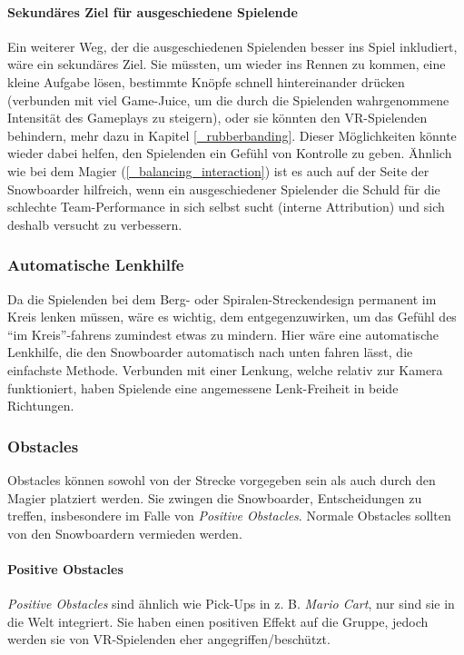 \paragraph{Sekundäres Ziel für ausgeschiedene Spielende}
Ein weiterer Weg, der die ausgeschiedenen Spielenden besser ins Spiel inkludiert, wäre ein sekundäres Ziel. Sie müssten, um wieder ins Rennen zu kommen, eine kleine Aufgabe lösen, bestimmte Knöpfe schnell hintereinander drücken (verbunden mit viel Game-Juice, um die durch die Spielenden wahrgenommene Intensität des Gameplays zu steigern), oder sie könnten den VR-Spielenden behindern, mehr dazu in Kapitel \ref{_rubberbanding}. Dieser Möglichkeiten könnte wieder dabei helfen, den Spielenden ein Gefühl von Kontrolle zu geben. Ähnlich wie bei dem Magier (\ref{_balancing_interaction}) ist es auch auf der Seite der Snowboarder hilfreich, wenn ein ausgeschiedener Spielender die Schuld für die schlechte Team-Performance in sich selbst sucht (interne Attribution) und sich deshalb versucht zu verbessern.

\subsubsection{Automatische Lenkhilfe}
Da die Spielenden bei dem Berg- oder Spiralen-Streckendesign permanent im Kreis lenken müssen, wäre es wichtig, dem entgegenzuwirken, um das Gefühl des "`im Kreis"'-fahrens zumindest etwas zu mindern. Hier wäre eine automatische Lenkhilfe, die den Snowboarder automatisch nach unten fahren lässt, die einfachste Methode. Verbunden mit einer Lenkung, welche relativ zur Kamera funktioniert, haben Spielende eine angemessene Lenk-Freiheit in beide Richtungen.

\subsubsection{Obstacles}
Obstacles können sowohl von der Strecke vorgegeben sein als auch durch den Magier platziert werden. Sie zwingen die Snowboarder, Entscheidungen zu treffen, insbesondere im Falle von \emph{Positive Obstacles}. Normale Obstacles sollten von den Snowboardern vermieden werden.

\paragraph{Positive Obstacles\label{_positive_obstacles}}
\emph{Positive Obstacles} sind ähnlich wie Pick-Ups in z. B. \emph{Mario Cart}, nur sind sie in die Welt integriert. Sie haben einen positiven Effekt auf die Gruppe, jedoch werden sie von VR-Spielenden eher angegriffen/beschützt.

